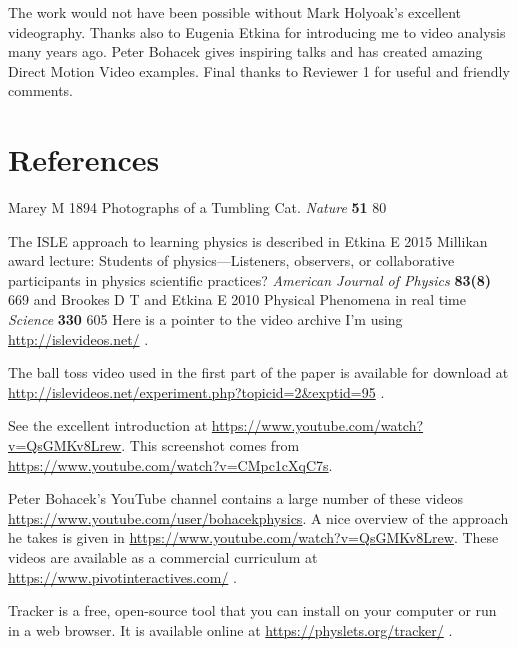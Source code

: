 \documentclass[12pt]{iopart}
\begin{document}
\ack
The work would not have been possible without Mark Holyoak's excellent videography.  Thanks also to Eugenia Etkina for introducing me to video analysis many years ago.  Peter Bohacek gives inspiring talks and has created amazing Direct Motion Video examples.  Final thanks to Reviewer 1 for useful and friendly comments.


\section*{References}
\begin{thebibliography}{99}

Marey M
1894
Photographs of a Tumbling Cat. 
{\it Nature }
{\bf 51} 
80

The ISLE approach to learning physics is described in 
Etkina E 
2015
Millikan award lecture: Students of physics—Listeners, observers, or collaborative participants in physics scientific practices?
{\it American Journal of Physics}
{\bf 83(8)}
669
and 
Brookes D T and Etkina E
2010
Physical Phenomena in real time
{\it Science}
{\bf 330}
605
Here is a pointer to the video archive I'm using \url{http://islevideos.net/} .
  
The ball toss video used in the first part of the paper is available for download at \url{http://islevideos.net/experiment.php?topicid=2&exptid=95} .

See the excellent introduction at 
\url{https://www.youtube.com/watch?v=QsGMKv8Lrew}. This screenshot comes from \url{https://www.youtube.com/watch?v=CMpc1cXqC7s}.

 Peter Bohacek's YouTube channel contains a large number of these videos \url{https://www.youtube.com/user/bohacekphysics}.  
A nice overview of the approach he takes is given in \url{https://www.youtube.com/watch?v=QsGMKv8Lrew}. 
These videos are available as a commercial curriculum at \url{https://www.pivotinteractives.com/} .

 Tracker is a free, open-source tool that you can install on your computer or run in a web browser.  It is available online at \url{https://physlets.org/tracker/} .


\end{thebibliography}
\end{document}
